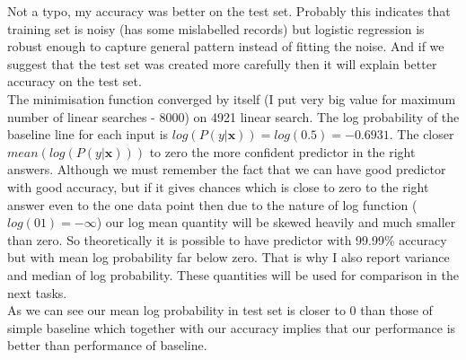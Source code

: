 \documentclass{article}
\newcommand{\vect}[1]{\boldsymbol{#1}} %
\begin{document}
\begin{enumerate}[label=(\alph*)]
\begin{center}
\begin{tabular}{| c | c | c |}
							\end{tabular}
						\end{center}
						Not a typo, my accuracy was better on the test set. Probably this indicates that training set is noisy (has some mislabelled records) but logistic regression is robust enough to capture general pattern instead of fitting the noise. And if we suggest that the test set was created more carefully then it will explain better accuracy on the test set.
						\\
						The minimisation function converged by itself (I put very big value for maximum number of linear searches - 8000) on 4921 linear search.  The log probability of the baseline line for each input is $log(P(y | \vect{x})) = log(0.5) = -0.6931$. The closer $mean(log(P(y|\vect{x})))$ to zero the more confident predictor in the right answers. Although we must remember the fact that we can have good predictor with good accuracy, but if it gives chances which is close to zero to the right answer even to the one data point then due to the nature of log function ($log(01)= -\infty$) our log mean quantity will be skewed heavily and much smaller than zero. So theoretically it is possible to have predictor with 99.99\% accuracy but with mean log probability far below zero. That is why I also report variance and median of log probability. These quantities will be used for comparison in the next tasks. 
						\\
						As we can see our mean log probability in  test set is closer to 0 than those of simple baseline which together with our accuracy  implies that our performance is better than performance of baseline.
						

\end{enumerate}
\end{document}
